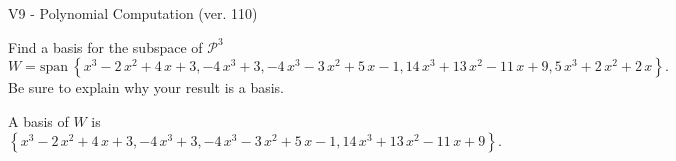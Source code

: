 \begin{exercise}
  \begin{exerciseTitle}V9 - Polynomial Computation (ver. 110)\end{exerciseTitle}
  \begin{exerciseStatement}
    Find a basis for the subspace of \(\mathcal{P}^3\) 
\[W=\mathrm{span}\ \left\{x^{3} - 2 \, x^{2} + 4 \, x + 3 , -4 \, x^{3} + 3 , -4 \, x^{3} - 3 \, x^{2} + 5 \, x - 1 , 14 \, x^{3} + 13 \, x^{2} - 11 \, x + 9 , 5 \, x^{3} + 2 \, x^{2} + 2 \, x\right\}.\]
 Be sure to explain why your result is a basis.


  \end{exerciseStatement}
  \begin{exerciseAnswer}
   A basis of \(W\) is  \(\left\{x^{3} - 2 \, x^{2} + 4 \, x + 3 , -4 \, x^{3} + 3 , -4 \, x^{3} - 3 \, x^{2} + 5 \, x - 1 , 14 \, x^{3} + 13 \, x^{2} - 11 \, x + 9\right\}\).
  


  \end{exerciseAnswer}
\end{exercise}
